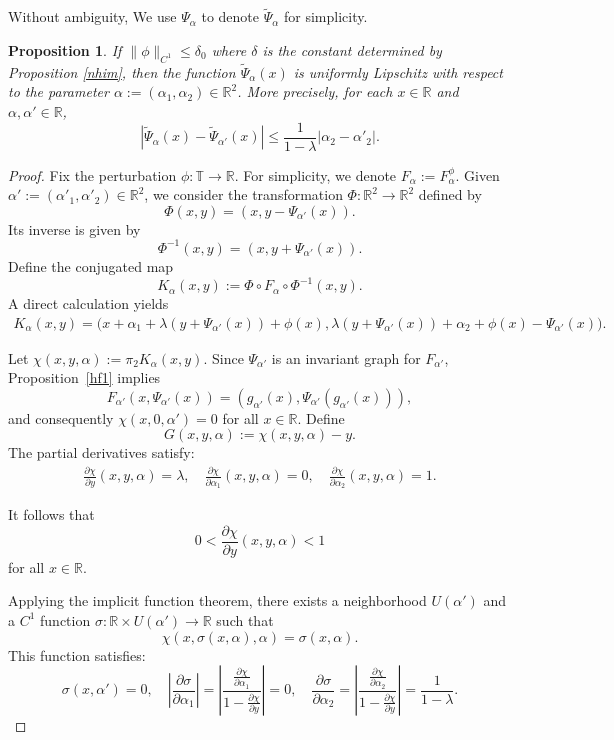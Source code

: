 \documentclass{amsart}
\newcommand{\R}{\mathbb{R}}
\newcommand{\al}{\alpha}
\newcommand{\T}{\mathbb{T}}
\newtheorem{Proposition}[Definition]{Proposition}
\theoremstyle{definition}
\begin{document}
Without ambiguity, We  use $\Psi_\al$ to denote $\tilde{\Psi}_\al$ for simplicity.
\begin{Proposition}\label{lipo}
 If $\|\phi\|_{C^1}\leq \delta_0$ where $\delta$ is the constant determined by Proposition \ref{nhim}, then the function $\tilde{\Psi}_\alpha(x)$ is uniformly Lipschitz with respect to the parameter $\alpha:=(\alpha_1,\alpha_2)\in \R^2$. More precisely, for each $x\in \R$ and $\al,{\al'}\in \R$,
\[|\tilde{\Psi}_\al(x)-\tilde{\Psi}_{\al'}(x)|\leq \frac{1}{1-\lambda}|\al_2-\al'_2|.\]
\end{Proposition}
\begin{proof}
Fix the perturbation $\phi:\T\to\R$. For simplicity, we denote $F_\alpha := F^{\phi}_\alpha$. Given $\alpha' := (\alpha'_1, \alpha'_2) \in \R^2$, we consider the transformation $\Phi:\R^2\to\R^2$ defined by
\[
\Phi(x,y) = (x, y - \Psi_{\alpha'}(x)).
\]
Its inverse is given by
\[
\Phi^{-1}(x,y) = (x, y + \Psi_{\alpha'}(x)).
\]
Define the conjugated map
\[
K_{\alpha}(x,y) := \Phi \circ F_\alpha \circ \Phi^{-1}(x,y).
\]
A direct calculation yields
\begin{align*}
K_{\alpha}(x,y) = \biggl(x +  \alpha_1+\lambda(y + \Psi_{\alpha'}(x)) +\phi(x), \lambda(y + \Psi_{\alpha'}(x)) + \alpha_2 + \phi(x) - \Psi_{\alpha'}(x)\biggr).
\end{align*}

Let $\chi(x,y,\alpha) := \pi_2 K_\alpha(x,y)$. Since $\Psi_{\alpha'}$ is an invariant graph for $F_{\alpha'}$, Proposition~\ref{hf1} implies
\[
F_{\alpha'}(x, \Psi_{\alpha'}(x)) = (g_{\alpha'}(x), \Psi_{\alpha'}(g_{\alpha'}(x))),
\]
and consequently $\chi(x,0,\alpha') = 0$ for all $x \in \R$. Define
\[
G(x,y,\alpha) := \chi(x,y,\alpha) - y.
\]
The partial derivatives satisfy:
\begin{align}
\frac{\partial \chi}{\partial y}(x,y,\alpha) = \lambda,\quad \frac{\partial \chi}{\partial \alpha_1}(x,y,\alpha) = 0,\quad \frac{\partial \chi}{\partial \alpha_2}(x,y,\alpha) = 1.
\end{align}

It follows that
\begin{equation}\label{contrpo}
0 < \frac{\partial \chi}{\partial y}(x,y,\alpha)  < 1
\end{equation}
for all $x \in \R$.

Applying the implicit function theorem, there exists a neighborhood $U(\alpha')$ and a $C^1$ function $\sigma:\R \times U(\alpha') \to \R$ such that
\[
\chi(x, \sigma(x, \alpha), \alpha) = \sigma(x, \alpha).
\]
This function satisfies:
\begin{equation}
 \sigma(x, \alpha') = 0,\quad
\left|\frac{\partial \sigma}{\partial \alpha_1}\right| = \left|\frac{\frac{\partial \chi}{\partial \alpha_1}}{1 - \frac{\partial \chi}{\partial y}}\right|=0,\quad
\frac{\partial \sigma}{\partial \alpha_2}= \left|\frac{\frac{\partial \chi}{\partial \alpha_2}}{1 - \frac{\partial \chi}{\partial y}}\right|=\frac{1}{1-\lambda}.
\end{equation}


\end{proof}
\end{document}
